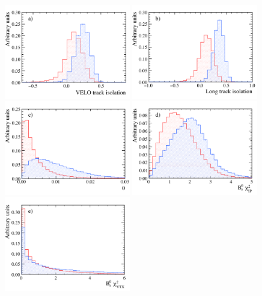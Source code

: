 \begin{figure}[tbp]
    \centering
        \includegraphics[width=0.49\textwidth]{./Figs/Selection/iso_vel_Mar.pdf}
              \includegraphics[width=0.49\textwidth]{./Figs/Selection/long_track_Mar.pdf}
        \includegraphics[width=0.49\textwidth]{./Figs/Selection/Arcos_Mar.pdf}
       \includegraphics[width=0.49\textwidth]{./Figs/Selection/B_IPS_Mar.pdf}
 \includegraphics[width=0.49\textwidth]{./Figs/Selection/Vertex_Mar.pdf}

\end{figure}
